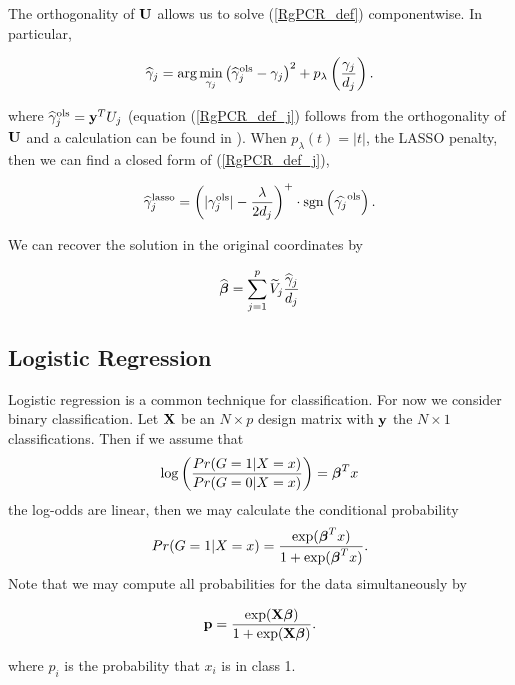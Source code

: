 \documentclass[main.tex]{subfiles}
\begin{document}
The orthogonality of $\mathbf{U}$ allows us to solve (\ref{RgPCR_def}) componentwise. In particular,

\begin{align}
    \widehat{\gamma}_j = \text{arg} \min_{\gamma_j}  \left ( \widehat{\gamma}^{\text{ols}}_j - \gamma_j \right )^2 + p_\lambda \left ( \frac{\gamma_j}{d_j} \right ).  \label{RgPCR_def_j}
\end{align}

where $\widehat{\gamma}^{\text{ols}}_j = \mathbf{y}^T U_j$ (equation (\ref{RgPCR_def_j}) follows from the orthogonality of $\mathbf{U}$ and a calculation can be found in \cite{langzou}). When $p_{\lambda}(t) = |t|$, the LASSO penalty, then we can find a closed form of (\ref{RgPCR_def_j}),

\begin{align}
	\widehat{\gamma}_j^{\text{lasso}} = \left ( |\gamma_j^{\text{ols}}| - \frac{\lambda}{2d_j} \right )^+ \cdot \text{sgn} \left ( \widehat{\gamma_j}^{\text{ols}} \right ).
\end{align}

We can recover the solution in the original coordinates by

\begin{align}
	\widehat{\boldsymbol \beta} = \sum_{j = 1}^p \widetilde{V}_j \frac{\widehat{\gamma}_j}{d_j}
\end{align}

\subsection{Logistic Regression}
Logistic regression is a common technique for classification. For now we consider binary classification. Let $\mathbf{X}$ be an $N \times p$ design matrix with $\mathbf{y}$ the $N \times 1$ classifications. Then if we assume that
\begin{align}
    \log \left ( \dfrac{Pr(G = 1 | X = x)}{Pr(G = 0|X = x)}\right ) = \boldsymbol \beta^Tx \label{log-odds}
\end{align}
the log-odds are linear, then we may calculate the conditional probability
\begin{align}
    Pr(G = 1 | X = x) = \dfrac{\text{exp}(\boldsymbol \beta^Tx)}{1 + \text{exp}(\boldsymbol \beta^Tx)}.
\end{align}
Note that we may compute all probabilities for the data simultaneously by

\begin{align}
	\mathbf{p} = \dfrac{\text{exp}(\mathbf{X} \boldsymbol \beta)}{1 + \text{exp}(\mathbf{X} \boldsymbol \beta)}.
\end{align}

where $p_i$ is the probability that $x_i$ is in class 1.
\end{document}
